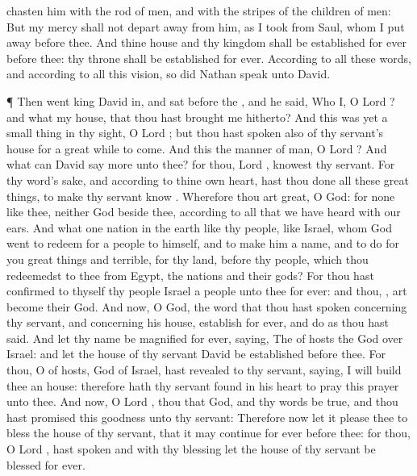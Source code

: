 {chasten him with the
rod of
men, and with the
stripes of the
children of
men:
But my
mercy shall not depart
away from him, as I
took
{} from
Saul, whom I put
away
before thee.
And thine
house and thy
kingdom shall be
established
for
ever
before thee: thy
throne shall be
established
for
ever.
According to all these
words, and according to all this
vision, so did
Nathan
speak unto
David.
\par }{\PP {}¶ Then
went
king
David in, and
sat
before the
{}, and he
said, Who
{} I, O
Lord
{}? and what
{} my
house, that thou hast
brought me
hitherto?
And this was yet a small
thing in thy
sight, O
Lord
{}; but thou hast
spoken also of thy
servant’s
house for a great while to
come. And
{} this the
manner of
man, O
Lord
{}?
And what
can
David
say
more unto thee? for thou,
Lord
{},
knowest thy
servant.
For thy
word’s sake, and according to thine own
heart, hast thou
done all these great
things, to make thy
servant
know
{}.
Wherefore thou art
great, O
{}
God: for
{} none like thee, neither
{}
God
beside thee, according to all that we have
heard with our
ears.
And what
one
nation in the
earth
{} like thy
people,
{} like
Israel, whom
God
went to
redeem for a
people to himself, and to
make him a
name, and to
do for you great
things and
terrible, for thy
land,
before thy
people, which thou
redeemedst to thee from
Egypt,
{} the
nations and their
gods?
For thou hast
confirmed to thyself thy
people
Israel
{} a
people unto thee
for
ever: and thou,
{}, art
become their
God.
And now, O
{}
God, the
word that thou hast
spoken concerning thy
servant, and concerning his
house,
establish
{}
for
ever, and
do as thou hast
said.
And let thy
name be
magnified
for
ever,
saying, The
{} of
hosts
{} the
God over
Israel: and let the
house of thy
servant
David be
established
before thee.
For thou, O
{} of
hosts,
God of
Israel, hast
revealed to thy
servant,
saying, I will
build thee an
house: therefore hath thy
servant
found in his
heart to
pray this
prayer unto thee.
And now, O
Lord
{}, thou
{} that
God, and thy
words be
true, and thou hast
promised this
goodness unto thy
servant:
Therefore now let it
please thee to
bless the
house of thy
servant, that it may continue for
ever
before thee: for thou, O
Lord
{}, hast
spoken
{} and with thy
blessing let the
house of thy
servant be
blessed for
ever.

}
